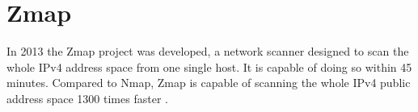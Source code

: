 \section{Zmap}
\label{s:HowZmapWorks}
In 2013 the Zmap project was developed, a network scanner designed to scan the whole IPv4 address space from one single host. It is capable of doing so within 45 minutes.
Compared to Nmap, Zmap is capable of scanning the whole IPv4 public address space 1300 times faster \autocite{durumeric2013zmap}.